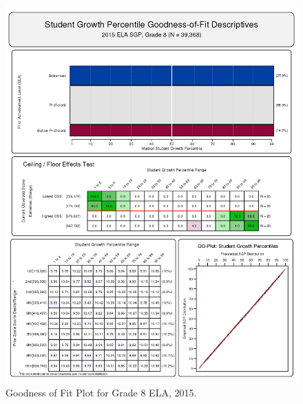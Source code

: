 \documentclass[12pt]{article}
\begin{document}
\begin{figure}[htbp]
\centering
\includegraphics{../img/Goodness_of_Fit/ELA.2015/2015_ELA_8;2014_ELA_7;2013_ELA_6;2012_ELA_5;2011_ELA_4;2010_ELA_3.png}
\caption{Goodness of Fit Plot for Grade 8 ELA, 2015.}
\end{figure}
\end{document}
